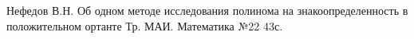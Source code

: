 \begin{thebibliography}{99}
\by Нефедов В.Н.
\paper Об одном методе исследования полинома на знакоопределенность в положительном ортанте
\jour  Тр. МАИ. Математика
\issue №22
\pages 43с.




















\end{thebibliography}
